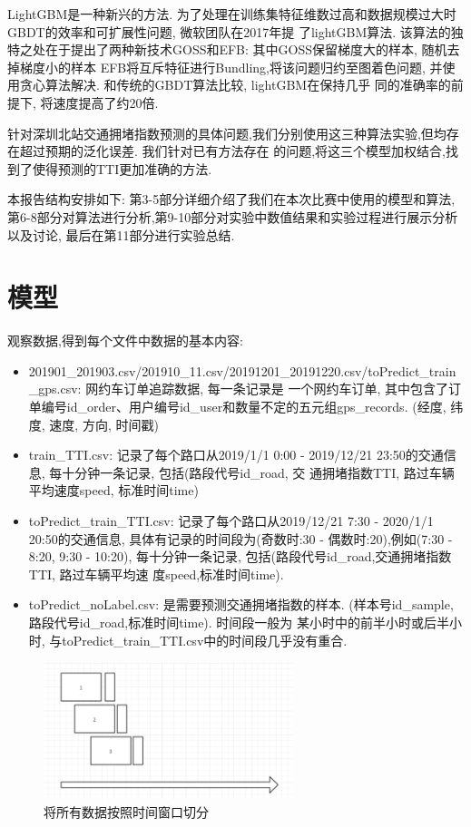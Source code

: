 \documentclass[a4paper,UTF8]{article}
\begin{document}
LightGBM是一种新兴的方法. 为了处理在训练集特征维数过高和数据规模过大时GBDT的效率和可扩展性问题, 微软团队在2017年提
了lightGBM算法\cite{ref3}. 该算法的独特之处在于提出了两种新技术GOSS和EFB: 其中GOSS保留梯度大的样本, 随机去掉梯度小的样本
EFB将互斥特征进行Bundling,将该问题归约至图着色问题, 并使用贪心算法解决. 和传统的GBDT算法比较, lightGBM在保持几乎
同的准确率的前提下, 将速度提高了约20倍. 

针对深圳北站交通拥堵指数预测的具体问题,我们分别使用这三种算法实验,但均存在超过预期的泛化误差. 我们针对已有方法存在
的问题,将这三个模型加权结合,找到了使得预测的TTI更加准确的方法. 

本报告结构安排如下: 第3-5部分详细介绍了我们在本次比赛中使用的模型和算法,
第6-8部分对算法进行分析,第9-10部分对实验中数值结果和实验过程进行展示分析以及讨论,
最后在第11部分进行实验总结. 

\section{模型}
观察数据,得到每个文件中数据的基本内容:
\begin{itemize}
	\item 201901\_201903.csv/201910\_11.csv/20191201\_20191220.csv/toPredict\_train\_gps.csv: 网约车订单追踪数据, 每一条记录是
	一个网约车订单, 其中包含了订单编号id\_order、用户编号id\_user和数量不定的五元组gps\_records. (经度, 纬度, 速度, 方向, 时间戳)
	\item train\_TTI.csv: 记录了每个路口从2019/1/1 0:00 - 2019/12/21 23:50的交通信息, 每十分钟一条记录, 包括(路段代号id\_road, 交
	通拥堵指数TTI, 路过车辆平均速度speed, 标准时间time)
	\item toPredict\_train\_TTI.csv: 记录了每个路口从2019/12/21 7:30 - 2020/1/1 20:50的交通信息, 具体有记录的时间段为(奇数时:30 -
	偶数时:20),例如(7:30 - 8:20, 9:30 - 10:20), 每十分钟一条记录, 包括(路段代号id\_road,交通拥堵指数TTI, 路过车辆平均速
	度speed,标准时间time).
	\item toPredict\_noLabel.csv: 是需要预测交通拥堵指数的样本. (样本号id\_sample, 路段代号id\_road,标准时间time). 时间段一般为
	某小时中的前半小时或后半小时, 与toPredict\_train\_TTI.csv中的时间段几乎没有重合. 
\end{itemize}

\begin{figure}[htbp]
	\centering
	\includegraphics[height=4cm]{time_window.png}
	\caption{将所有数据按照时间窗口切分}
\end{figure}
\end{document}
